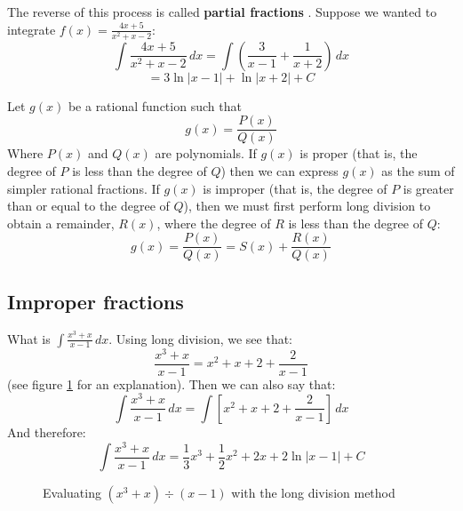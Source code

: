 The reverse of this process is called \textbf{partial fractions} 
. Suppose we wanted to integrate $f(x) = \frac{4x + 5}
{x^2 + x - 2}$:
$$\int \frac{4x + 5}{x^2 + x - 2}\,dx = \int \left( \frac{3}{x - 1} + \frac{1}{
x + 2} \right)\,dx$$
$$= 3\ln{|x - 1|} + \ln{|x + 2|} + C$$

Let $g(x)$ be a rational function such that 
$$g(x) = \frac{P(x)}{Q(x)}$$
Where $P(x)$ and $Q(x)$ are polynomials. If $g(x)$ is proper (that is, the degree of $P$ is less than the degree of $Q$) then we can express $g(x)$ as the sum of simpler rational fractions. If $g(x)$ is improper (that is, the degree of $P$ is greater than or equal to the degree of $Q$), then we must first perform long division to obtain a remainder, $R(x)$, where the degree of $R$ is less than the degree of $Q$:
$$g(x) = \frac{P(x)}{Q(x)} = S(x) + \frac{R(x)}{Q(x)}$$

\subsection{Improper fractions}
What is $\int \frac{x^3 + x}{x-1}\,dx$. Using long division, we see that:
$$\frac{x^3 + x}{x - 1} = x^2 + x + 2 + \frac{2}{x - 1}$$
(see figure \ref{polylongdiv} for an explanation). Then we can also say that:
$$\int \frac{x^3 + x}{x-1}\,dx = \int \left[x^2 + x + 2 + \frac{2}{x-1} \right]\,dx$$
And therefore:
$$\int \frac{x^3 + x}{x-1}\,dx = \frac{1}{3}x^3 + \frac{1}{2}x^2 + 2x + 2\ln{|x-1|} + C$$

\begin{figure}[htbp]
\centering
    \caption{Evaluating $(x^3 + x) \div (x - 1)$ with the long division method}
    \label{polylongdiv}
\end{figure}

